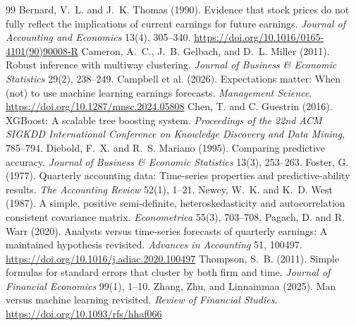 \documentclass[11pt]{article}
\begin{document}
\begin{thebibliography}{99}
 Bernard, V.~L. and J.~K. Thomas (1990). Evidence that stock prices do
not fully reflect the implications of current earnings for future earnings. \emph{Journal of Accounting and Economics}
13(4), 305--340. \url{https://doi.org/10.1016/0165-4101(90)90008-R}
 Cameron, A.~C., J.~B. Gelbach, and D.~L. Miller (2011). Robust inference
with multiway clustering. \emph{Journal of Business \& Economic Statistics} 29(2), 238--249.
 Campbell et al. (2026). Expectations matter: When (not) to use machine
learning earnings forecasts. \emph{Management Science}. \url{https://doi.org/10.1287/mnsc.2024.05808}
 Chen, T. and C. Guestrin (2016). XGBoost: A scalable tree boosting system.
\emph{Proceedings of the 22nd ACM SIGKDD International Conference on Knowledge Discovery and Data Mining}, 785--794.
 Diebold, F.~X. and R.~S. Mariano (1995). Comparing predictive
accuracy. \emph{Journal of Business \& Economic Statistics} 13(3), 253--263.
 Foster, G. (1977). Quarterly accounting data: Time-series properties and
predictive-ability results. \emph{The Accounting Review} 52(1), 1--21.
 Newey, W.~K. and K.~D. West (1987). A simple, positive semi-definite,
heteroskedasticity and autocorrelation consistent covariance matrix. \emph{Econometrica} 55(3), 703--708.
 Pagach, D. and R. Warr (2020). Analysts versus time-series forecasts of
quarterly earnings: A maintained hypothesis revisited. \emph{Advances in Accounting} 51, 100497.
\url{https://doi.org/10.1016/j.adiac.2020.100497}
 Thompson, S.~B. (2011). Simple formulas for standard errors that cluster by
both firm and time. \emph{Journal of Financial Economics} 99(1), 1--10.
 Zhang, Zhu, and Linnainmaa (2025). Man versus machine learning revisited.
\emph{Review of Financial Studies}. \url{https://doi.org/10.1093/rfs/hhaf066}
\end{thebibliography}
\end{document}
